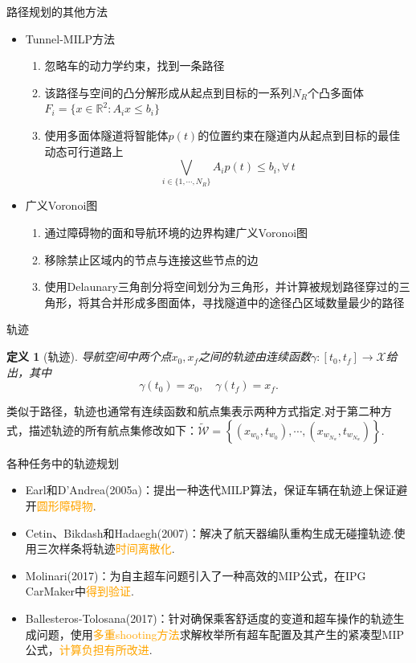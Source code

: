 \documentclass[notheorems,11pt]{beamer}
\theoremstyle{plain}
\numberwithin{theorem}{section}
\newtheorem{definition}{定义}
\numberwithin{lemma}{section}
\numberwithin{corollary}{section}
\theoremstyle{example}
\newcommand{\hl}[1]{\textcolor{orange}{#1}}
\begin{document}
\begin{frame}{路径规划的其他方法}
  \begin{itemize}
    \item Tunnel-MILP方法
    \begin{enumerate}
      \item 忽略车的动力学约束，找到一条路径
      \item 该路径与空间的凸分解形成从起点到目标的一系列$N_R$个凸多面体$F_i=\{x\in\mathbb{R}^2:A_ix\leqslant b_i\}$
      \item 使用多面体隧道将智能体$p(t)$的位置约束在隧道内从起点到目标的最佳动态可行道路上
      \begin{equation}
      \bigvee_{i\in\{1,\cdots,N_R\}}{A_ip(t)\leqslant b_i},\forall\, t
      \end{equation}
    \end{enumerate}
    \item 广义Voronoi图
    \begin{enumerate}
      \item 通过障碍物的面和导航环境的边界构建广义Voronoi图
      \item 移除禁止区域内的节点与连接这些节点的边
      \item 使用Delaunary三角剖分将空间划分为三角形，并计算被规划路径穿过的三角形，将其合并形成多图面体，寻找隧道中的途径凸区域数量最少的路径
    \end{enumerate}
  \end{itemize}
\end{frame}


\begin{frame}{轨迹}
  \begin{definition}[轨迹]
    导航空间中两个点$x_0,x_f$之间的轨迹由连续函数$\gamma:[t_0,t_f]\to \mathcal{X}$给出，其中
    \begin{equation}
      \gamma(t_0)=x_0,\quad \gamma(t_f)=x_f.
    \end{equation}
  \end{definition}
  类似于路径，轨迹也通常有连续函数和航点集表示两种方式指定.对于第二种方式，描述轨迹的所有航点集修改如下：$\widetilde{\mathcal{W}}=\left\{\left(x_{w_0},t_{w_0}\right),\cdots,\left(x_{w_{N_w}},t_{w_{N_w}}\right)\right\}$.
\end{frame}

\begin{frame}{各种任务中的轨迹规划}
  \begin{itemize}
    \item Earl和D'Andrea(2005a)：提出一种迭代MILP算法，保证车辆在轨迹上保证避开\hl{圆形障碍物}.
    \item Cetin、Bikdash和Hadaegh(2007)：解决了航天器编队重构生成无碰撞轨迹.使用三次样条将轨迹\hl{时间离散化}.
    \item Molinari(2017)：为自主超车问题引入了一种高效的MIP公式，在IPG CarMaker中\hl{得到验证}.
    \item Ballesteros-Tolosana(2017)：针对确保乘客舒适度的变道和超车操作的轨迹生成问题，使用\hl{多重shooting方法}求解枚举所有超车配置及其产生的紧凑型MIP公式，\hl{计算负担有所改进}.
  \end{itemize}
\end{frame}
\end{document}
